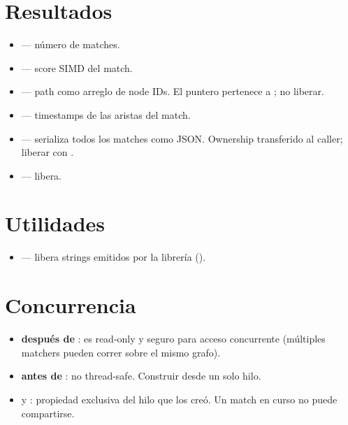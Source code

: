 \section{Resultados}

\begin{itemize}
    \item {}
    — número de matches.
    \item {} — score SIMD del match.
    \item {} — path como arreglo de
    node IDs. El puntero pertenece a ; no liberar.
    \item {} —
    timestamps de las aristas del match.
    \item {} —
    serializa todos los matches como JSON. Ownership transferido
    al caller; liberar con .
    \item {} — libera.
\end{itemize}

\section{Utilidades}

\begin{itemize}
    \item {} — libera strings
    emitidos por la librería ().
\end{itemize}

\section{Concurrencia}

\begin{itemize}
    \item {} \textbf{después de }: es
    read-only y seguro para acceso concurrente (múltiples matchers
    pueden correr sobre el mismo grafo).
    \item {} \textbf{antes de }: no
    thread-safe. Construir desde un solo hilo.
    \item {} y : propiedad
    exclusiva del hilo que los creó. Un match en curso no puede
    compartirse.
\end{itemize}

